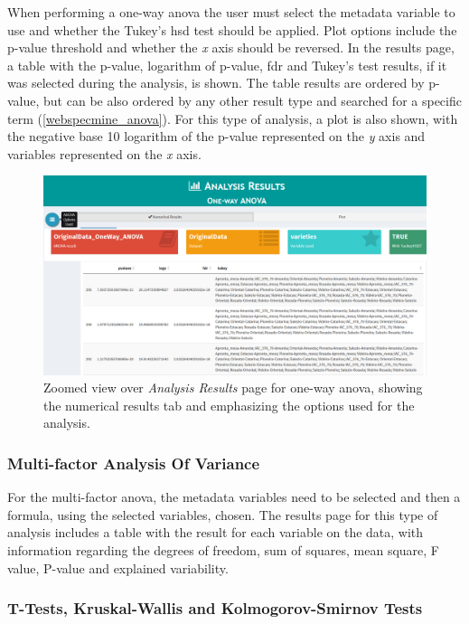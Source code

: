 When performing a one-way \gls{anova} the user must select the metadata variable to use and whether the Tukey's \gls{hsd} test should be applied. Plot options include the p-value threshold and whether the \textit{x} axis should be reversed. In the results page, a table with the p-value, logarithm of p-value, \gls{fdr} and Tukey's test results, if it was selected during the analysis, is shown. The table results are ordered by p-value, but can be also ordered by any other result type and searched for a specific term (\autoref{webspecmine_anova}). For this type of analysis, a plot is also shown, with the negative base 10 logarithm of the p-value represented on the \textit{y} axis and variables represented on the \textit{x} axis. 

\begin{figure}[h]
	\centering
	\includegraphics[width=1\linewidth]{Imagens/webspecmine_anova}
	\caption{Zoomed view over \textit{Analysis Results} page for one-way \gls{anova}, showing the numerical results tab and emphasizing the options used for the analysis.}
	\label{webspecmine_anova}
\end{figure}

\subsubsection{Multi-factor Analysis Of Variance}

For the multi-factor \gls{anova}, the metadata variables need to be selected and then a formula, using the selected variables, chosen. The results page for this type of analysis includes a table with the result for each variable on the data, with information regarding the degrees of freedom, sum of squares, mean square, F value, P-value and explained variability.

\subsubsection{T-Tests, Kruskal-Wallis and Kolmogorov-Smirnov Tests}

